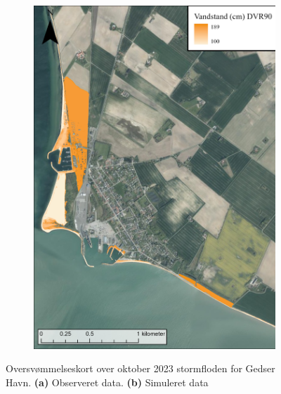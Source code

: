 \begin{figure}[H]
\begin{subfigure}[t]{0.5\textwidth}
        \includegraphics[width=0.95\linewidth]{images/Resultater/2023Model/2023 model_gedser.jpg}
        \caption{}
        \label{Subfig: Model Gedser}
    \end{subfigure}
    \caption{Oversvømmelseskort over oktober 2023 stormfloden for Gedser Havn. \textbf{(a)} Observeret data. \textbf{(b)} Simuleret data}
    \label{Figur: Målt & simuleret Gedser}
\end{figure}


